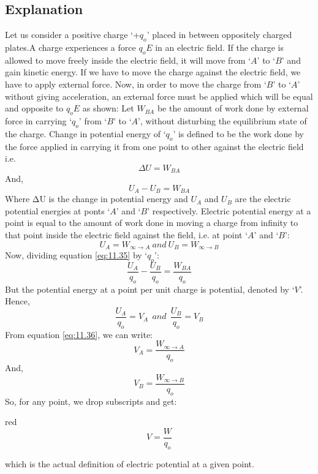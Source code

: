 \subsection*{Explanation}
Let us consider a positive charge `+$q_{o}$’ placed in between
oppositely charged plates.A charge experiences a force $q_{o}E$ in an
electric field. If the charge is allowed to move freely inside the electric field,
it will move from `$A$' to `$B$' and gain kinetic energy. If we have to move the
charge against the electric field, we have to apply external force. Now,
in order to move the charge from `$B$' to `$A$' without giving acceleration,
an external force must be applied which will be equal and opposite to $q_{o}E$
as shown:
Let $W_{BA}$ be the amount of work done by external force in carrying `$q_{o}$’
from `$B$' to `$A$', without disturbing the equilibrium state of the charge.
Change in potential energy of `$q_{o}$’ is defined to be the work
done by the force applied in carrying it from one point to other against the
electric field i.e.
\begin{equation}
  \Delta U = W_{BA} \nonumber
\end{equation}
And,
\begin{equation}\label{eq:11.35}
   U_{A} - U_{B} = W_{BA} 
\end{equation}
Where ΔU is the change in potential energy and $U_{A}$ and $U_{B}$ are the
electric potential energies at ponts `$A$' and `$B$' respectively. Electric potential
energy at a point is equal to the amount of work done in moving a charge from
infinity to that point inside the electric field against the field, i.e.
at point `$A$' and `$B$':
\begin{equation}\label{eq:11.36}
  U_{A} = W_{\infty\rightarrow A}\:and\:U_{B} = W_{\infty\rightarrow B}
\end{equation}
Now, dividing equation \ref{eq:11.35} by `$q_{o}$’:
\begin{equation}\label{eq:11.37}
  \frac{U_{A}}{q_{o}} - \frac{U_{B}}{q_{o}} = \frac{W_{BA}}{q_{o}}
\end{equation}
But the potential energy at a point per unit charge is potential,
denoted by `$V$'. Hence,
\begin{equation}\label{eq:11.38}
  \frac{U_{A}}{q_{o}} = V_{A} \:\: and \:\: \frac{U_{B}}{q_{o}} = V_{B} 
\end{equation}
From equation \ref{eq:11.36}, we can write:
\begin{equation}\label{eq:11.37}
  V_{A} =\frac{W_{\infty\rightarrow A}}{q_{o}}
\end{equation}
And,
\begin{equation}\label{eq:11.40}
  V_{B} = \frac{W_{\infty\rightarrow B}}{q_{o}}
\end{equation}
So, for any point, we drop subscripts and get:
\begin{mybox}{red}{}
\begin{equation}\label{eq:11.41}
  V = \frac{W}{q_{o}}
\end{equation}
\end{mybox}
\noindent which is the actual  definition of electric potential at a given point.

